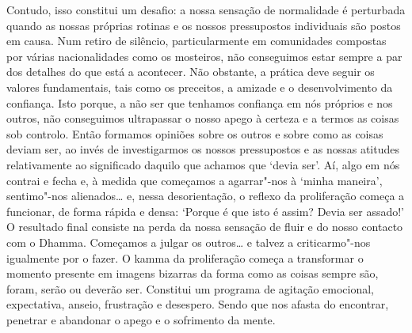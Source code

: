 Contudo, isso constitui um desafio: a nossa sensação de normalidade é perturbada
quando as nossas próprias rotinas e os nossos pressupostos individuais são
postos em causa. Num retiro de silêncio, particularmente em comunidades
compostas por várias nacionalidades como os mosteiros, não conseguimos estar
sempre a par dos detalhes do que está a acontecer. Não obstante, a prática deve
seguir os valores fundamentais, tais como os preceitos, a amizade e o
desenvolvimento da confiança. Isto porque, a não ser que tenhamos confiança em
nós próprios e nos outros, não conseguimos ultrapassar o nosso apego à certeza e
a termos as coisas sob controlo. Então formamos opiniões sobre os outros e sobre
como as coisas deviam ser, ao invés de investigarmos os nossos pressupostos e as
nossas atitudes relativamente ao significado daquilo que achamos que `devia
ser'. Aí, algo em nós contrai e fecha e, à medida que começamos a agarrar"-nos à
`minha maneira', sentimo"-nos alienados\ldots{} e, nessa desorientação, o
reflexo da proliferação começa a funcionar, de forma rápida e densa: `Porque é
que isto é assim? Devia ser assado!' O resultado final consiste na perda da
nossa sensação de fluir e do nosso contacto com o Dhamma. Começamos a julgar os
outros\ldots{} e talvez a criticarmo"-nos igualmente por o fazer. O kamma da
proliferação começa a transformar o momento presente em imagens bizarras da
forma como as coisas sempre são, foram, serão ou deverão ser. Constitui um
programa de agitação emocional, expectativa, anseio, frustração e desespero.
Sendo que nos afasta do encontrar, penetrar e abandonar o apego e o sofrimento
da mente.

